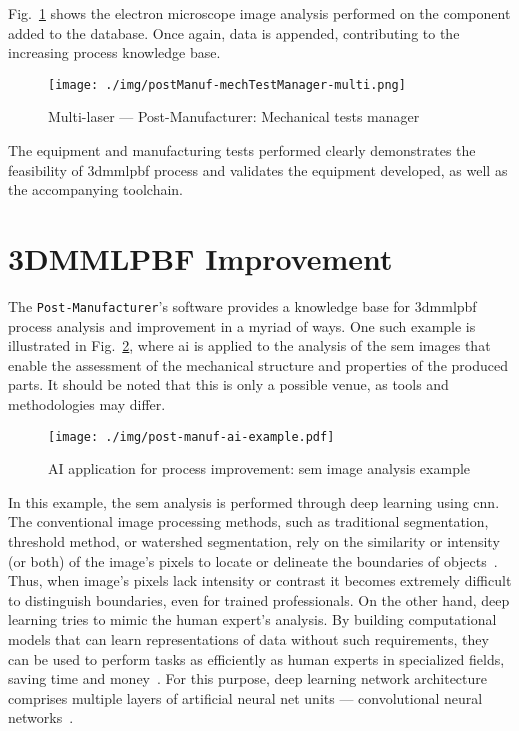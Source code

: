 Fig.~\ref{fig:postManuf-mechTestManager-multi} shows the electron microscope image
analysis performed on the component added to the database.
Once again, data is appended, contributing to the increasing process
knowledge base.

\begin{figure}[hbtp!]
  \centering
    \texttt{[image: ./img/postManuf-mechTestManager-multi.png]}
  \caption{Multi-laser --- Post-Manufacturer: Mechanical tests manager}%
  \label{fig:postManuf-mechTestManager-multi}
\end{figure}




The equipment and manufacturing tests performed clearly demonstrates the
feasibility of \gls{3dmmlpbf} process and validates the equipment developed, as
well as the accompanying toolchain.



\section{3DMMLPBF Improvement}%
\label{sec:prosp-proc-impr}
The \texttt{Post-Manufacturer}'s software provides a knowledge base for
\gls{3dmmlpbf} process analysis and improvement in a myriad of ways. One such
example is illustrated in Fig.~\ref{fig:post-manuf-ai-application}, where
\gls{ai} is applied to the analysis of the \gls{sem} images that enable the
assessment of the
mechanical structure and properties of the produced parts.
It should be noted that this is only a possible venue, as tools and
methodologies may differ.

\begin{figure}[hbtp!]
  \centering
    \texttt{[image: ./img/post-manuf-ai-example.pdf]}
  \caption{AI application for process improvement: \gls{sem} image analysis
    example}%
  \label{fig:post-manuf-ai-application}
\end{figure}

In this example, the \gls{sem} analysis is performed through deep learning using
\gls{cnn}. The conventional image processing methods,
such as traditional segmentation, threshold method, or watershed segmentation,
rely on the similarity or intensity (or both) of the image's pixels to locate or
delineate the boundaries of objects~\cite{chen2020DeepLearningSEM}. Thus, when
image's pixels lack intensity or contrast it becomes extremely difficult to
distinguish boundaries, even for trained professionals. 
On the other hand, deep learning tries to mimic the human expert's analysis. By
building computational models that can learn
representations of data without such requirements, they can be used to
perform tasks as efficiently as human experts in specialized fields, saving time
and money~\cite{chen2020DeepLearningSEM}. For this purpose, deep learning
network architecture comprises multiple layers of artificial neural net
units --- convolutional neural networks~\cite{chen2020DeepLearningSEM}.

